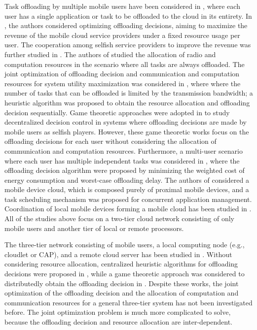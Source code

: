 \documentclass[10pt,journal,compsoc]{IEEEtran}
\begin{document}
Task offloading by multiple mobile users have been considered in
\cite{hoang2012,Hoang2014,kaewpuang2013,ren2013,sardellitti2015,lyu2017,chen2014,meskar2017,chen2015efficient},
where each user has a single application or task to be offloaded to
the cloud in its entirety. In
\cite{hoang2012,Hoang2014,kaewpuang2013}, the authors considered
optimizing offloading decisions, aiming to maximize the revenue of
the mobile cloud service providers under a fixed resource usage per
user. The cooperation among selfish service providers to improve the
revenue was further studied in \cite{kaewpuang2013}.
 The authors
of \cite{ren2013,sardellitti2015} studied the allocation of radio
and computation resources in the scenario where all tasks are always
offloaded. The joint optimization of offloading decision and
communication and computation resources for system utility
maximization was considered in \cite{lyu2017}, where where the
number of tasks that can be offloaded is limited by the transmission
bandwidth; a heuristic algorithm  was proposed to obtain the
resource allocation and offloading decision sequentially.
 Game theoretic
approaches were adopted in
\cite{chen2014,meskar2017,chen2015efficient} to study decentralized
decision control in systems where offloading decisions are made by
mobile users as selfish players. However, these game theoretic works
focus on the offloading decisions for each user without considering
the allocation of communication and computation resources.
Furthermore, a multi-user scenario where each user has multiple
independent tasks was considered in \cite{chen2016icc}, where the
offloading decision algorithm were proposed by minimizing the
weighted cost of energy consumption and worst-case offloading delay.
The authors of \cite{viswanathan2016} considered a mobile device
cloud, which is composed purely of proximal mobile devices, and a
task scheduling mechanism was proposed for concurrent application
management. Coordination of local mobile devices forming a mobile
cloud has been studied in \cite{Habak2015}. All of the studies above
focus on a two-tier cloud network consisting of only mobile users
and another tier of local or remote processors.

The three-tier network consisting of mobile users, a local computing
node (e.g., cloudlet or CAP), and a remote cloud server has been
studied in
\cite{Rahimi2012,Rahimi2013,Song2014,cardellini2016,chen2017infocom}.
Without considering resource allocation, centralized heuristic
algorithms for offloading decisions were proposed in
\cite{Rahimi2012,Rahimi2013,Song2014}, while a game theoretic
approach was considered to distributedly obtain the offloading
decision in \cite{cardellini2016}. Despite these works, the joint
optimization of the offloading decision and the allocation of
computation and communication resources for a general three-tier
system has not been investigated before. The joint optimization
problem is much more complicated to solve, because the offloading
decision and resource allocation are inter-dependent.
\end{document}
